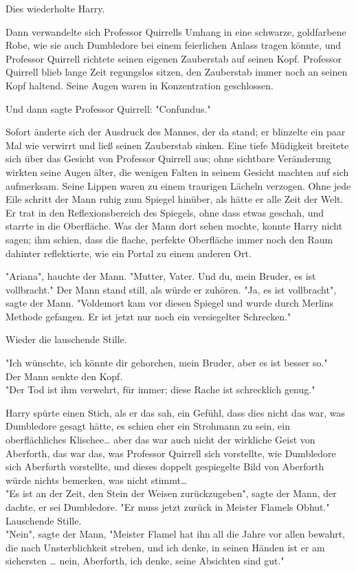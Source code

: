 {Dies wiederholte Harry.

Dann verwandelte sich Professor Quirrells Umhang in eine schwarze, goldfarbene Robe, wie sie auch Dumbledore bei einem feierlichen Anlass tragen könnte, und Professor Quirrell richtete seinen eigenen Zauberstab auf seinen Kopf. Professor Quirrell blieb lange Zeit regungslos sitzen, den Zauberstab immer noch an seinen Kopf haltend. Seine Augen waren in Konzentration geschlossen.

Und dann sagte Professor Quirrell: "Confundus."

Sofort änderte sich der Ausdruck des Mannes, der da stand; er blinzelte ein paar Mal wie verwirrt und ließ seinen Zauberstab sinken. Eine tiefe Müdigkeit breitete sich über das Gesicht von Professor Quirrell aus; ohne sichtbare Veränderung wirkten seine Augen älter, die wenigen Falten in seinem Gesicht machten auf sich aufmerksam. Seine Lippen waren zu einem traurigen Lächeln verzogen. Ohne jede Eile schritt der Mann ruhig zum Spiegel hinüber, als hätte er alle Zeit der Welt. Er trat in den Reflexionsbereich des Spiegels, ohne dass etwas geschah, und starrte in die Oberfläche. Was der Mann dort sehen mochte, konnte Harry nicht sagen; ihm schien, dass die flache, perfekte Oberfläche immer noch den Raum dahinter reflektierte, wie ein Portal zu einem anderen Ort.

"Ariana", hauchte der Mann. "Mutter, Vater. Und du, mein Bruder, es ist vollbracht." Der Mann stand still, als würde er zuhören. "Ja, es ist vollbracht", sagte der Mann. "Voldemort kam vor diesen Spiegel und wurde durch Merlins Methode gefangen. Er ist jetzt nur noch ein versiegelter Schrecken."

Wieder die lauschende Stille.

"Ich wünschte, ich könnte dir gehorchen, mein Bruder, aber es ist besser so."\\ Der Mann senkte den Kopf.\\ "Der Tod ist ihm verwehrt, für immer; diese Rache ist schrecklich genug."

Harry spürte einen Stich, als er das sah, ein Gefühl, dass dies nicht das war, was Dumbledore gesagt hätte, es schien eher ein Strohmann zu sein, ein oberflächliches Klischee… aber das war auch nicht der wirkliche Geist von Aberforth, das war das, was Professor Quirrell sich vorstellte, wie Dumbledore sich Aberforth vorstellte, und dieses doppelt gespiegelte Bild von Aberforth würde nichts bemerken, was nicht stimmt…\\ "Es ist an der Zeit, den Stein der Weisen zurückzugeben", sagte der Mann, der dachte, er sei Dumbledore. "Er muss jetzt zurück in Meister Flamels Obhut."\\ Lauschende Stille.\\ "Nein", sagte der Mann, "Meister Flamel hat ihn all die Jahre vor allen bewahrt, die nach Unsterblichkeit streben, und ich denke, in seinen Händen ist er am sichersten … nein, Aberforth, ich denke, seine Absichten sind gut."

}
